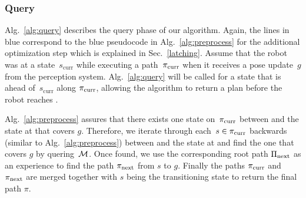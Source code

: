 \documentclass[conference]{IEEEtran}
\begin{document}
\subsubsection{Query}
Alg.~\ref{alg:query} describes the query phase of our algorithm. Again, the lines in blue correspond to the blue pseudocode in Alg.~\ref{alg:preprocess} for the additional optimization step which is explained in Sec.~\ref{latching}.
Assume that the robot was at a state~$s_{\textrm{curr}}$ while executing a path~$\pi_{\rm curr}$ when it receives a pose update~$g$ from the perception system. Alg.~\ref{alg:query} will be called for a state \Sstart that is \Tbound ahead of~$s_{\textrm{curr}}$ along $\pi_{\rm curr}$, allowing the algorithm to return a plan before the robot reaches \Sstart.

Alg.~\ref{alg:preprocess} assures that there exists one state on~$\pi_{\rm curr}$ between \Sstart and the state at \Trc that covers $g$. Therefore, we iterate through each~$s \in \pi_{\rm curr}$ backwards (similar to Alg.~\ref{alg:preprocess}) between \Sstart and the state at \Trc and find the one that covers $g$ by quering~$\mathcal{M}$. Once found, we use the corresponding root path $\Pi_{\rm next}$ as an experience to find the path $\pi_{\rm next}$ from $s$ to $g$. Finally the paths $\pi_{\rm curr}$ and $\pi_{\rm next}$ are merged together with $s$ being the transitioning state to return the final path $\pi$. 
\end{document}
